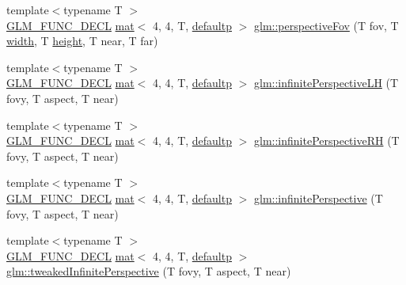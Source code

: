 \begin{DoxyCompactItemize}
\item 
{\footnotesize template$<$typename T $>$ }\\\mbox{\hyperlink{setup_8hpp_ab2d052de21a70539923e9bcbf6e83a51}{G\+L\+M\+\_\+\+F\+U\+N\+C\+\_\+\+D\+E\+CL}} \mbox{\hyperlink{structglm_1_1mat}{mat}}$<$ 4, 4, T, \mbox{\hyperlink{namespaceglm_a36ed105b07c7746804d7fdc7cc90ff25a9d21ccd8b5a009ec7eb7677befc3bf51}{defaultp}} $>$ \mbox{\hyperlink{group__gtc__matrix__transform_gaebd02240fd36e85ad754f02ddd9a560d}{glm\+::perspective\+Fov}} (T fov, T \mbox{\hyperlink{_s_d_l__opengl_8h_a9a82cf3caff84cabc4598e2619faac17}{width}}, T \mbox{\hyperlink{_s_d_l__opengl_8h_aa352f2804b9902ac30769c00dde75d5f}{height}}, T near, T far)
\item 
{\footnotesize template$<$typename T $>$ }\\\mbox{\hyperlink{setup_8hpp_ab2d052de21a70539923e9bcbf6e83a51}{G\+L\+M\+\_\+\+F\+U\+N\+C\+\_\+\+D\+E\+CL}} \mbox{\hyperlink{structglm_1_1mat}{mat}}$<$ 4, 4, T, \mbox{\hyperlink{namespaceglm_a36ed105b07c7746804d7fdc7cc90ff25a9d21ccd8b5a009ec7eb7677befc3bf51}{defaultp}} $>$ \mbox{\hyperlink{group__gtc__matrix__transform_ga3201b30f5b3ea0f933246d87bfb992a9}{glm\+::infinite\+Perspective\+LH}} (T fovy, T aspect, T near)
\item 
{\footnotesize template$<$typename T $>$ }\\\mbox{\hyperlink{setup_8hpp_ab2d052de21a70539923e9bcbf6e83a51}{G\+L\+M\+\_\+\+F\+U\+N\+C\+\_\+\+D\+E\+CL}} \mbox{\hyperlink{structglm_1_1mat}{mat}}$<$ 4, 4, T, \mbox{\hyperlink{namespaceglm_a36ed105b07c7746804d7fdc7cc90ff25a9d21ccd8b5a009ec7eb7677befc3bf51}{defaultp}} $>$ \mbox{\hyperlink{group__gtc__matrix__transform_ga99672ffe5714ef478dab2437255fe7e1}{glm\+::infinite\+Perspective\+RH}} (T fovy, T aspect, T near)
\item 
{\footnotesize template$<$typename T $>$ }\\\mbox{\hyperlink{setup_8hpp_ab2d052de21a70539923e9bcbf6e83a51}{G\+L\+M\+\_\+\+F\+U\+N\+C\+\_\+\+D\+E\+CL}} \mbox{\hyperlink{structglm_1_1mat}{mat}}$<$ 4, 4, T, \mbox{\hyperlink{namespaceglm_a36ed105b07c7746804d7fdc7cc90ff25a9d21ccd8b5a009ec7eb7677befc3bf51}{defaultp}} $>$ \mbox{\hyperlink{group__gtc__matrix__transform_ga44fa38a18349450325cae2661bb115ca}{glm\+::infinite\+Perspective}} (T fovy, T aspect, T near)
\item 
{\footnotesize template$<$typename T $>$ }\\\mbox{\hyperlink{setup_8hpp_ab2d052de21a70539923e9bcbf6e83a51}{G\+L\+M\+\_\+\+F\+U\+N\+C\+\_\+\+D\+E\+CL}} \mbox{\hyperlink{structglm_1_1mat}{mat}}$<$ 4, 4, T, \mbox{\hyperlink{namespaceglm_a36ed105b07c7746804d7fdc7cc90ff25a9d21ccd8b5a009ec7eb7677befc3bf51}{defaultp}} $>$ \mbox{\hyperlink{group__gtc__matrix__transform_gaaeacc04a2a6f4b18c5899d37e7bb3ef9}{glm\+::tweaked\+Infinite\+Perspective}} (T fovy, T aspect, T near)

\end{DoxyCompactItemize}
